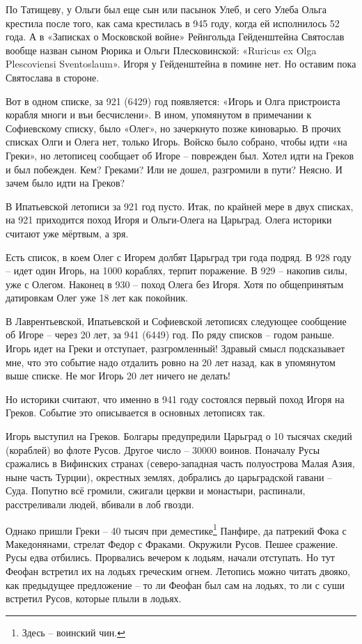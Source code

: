 По Татищеву, у Ольги был еще сын или пасынок Улеб, и сего Улеба Ольга крестила после того, как сама крестилась в 945 году, когда ей исполнилось 52 года. А в «Записках о Московской войне» Рейнгольда Гейденштейна Святослав вообще назван сыном Рюрика и Ольги Плесковинской: «Ruricus ex Olga Plescoviensi Sventoslaum». Игоря у Гейденштейна в помине нет. Но оставим пока Святослава в стороне.

Вот в одном списке, за 921 (6429) год появляется: «Игорь и Олга пристроиста корабля многи и въи бесчислени». В ином, упомянутом в примечании к Софиевскому списку, было «Олег», но зачеркнуто позже киноварью. В прочих списках Олги и Олега нет, только Игорь. Войско было собрано, чтобы идти «на Греки», но летописец сообщает об Игоре – поврежден был. Хотел идти на Греков и был побежден. Кем? Греками? Или не дошел, разгромили в пути? Неясно. И зачем было идти на Греков?

В Ипатьевской летописи за 921 год пусто. Итак, по крайней мере в двух списках, на 921 приходится поход Игоря и Ольги-Олега на Царьград. Олега историки считают уже мёртвым, а зря.

Есть список, в коем Олег с Игорем долбят Царьград три года подряд. В 928 году – идет один Игорь, на 1000 кораблях, терпит поражение. В 929 – накопив силы, уже с Олегом. Наконец в 930 – поход Олега без Игоря. Хотя по общепринятым датировкам Олег уже 18 лет как покойник.

В Лаврентьевской, Ипатьевской и Софиевской летописях следующее сообщение об Игоре – через 20 лет, за 941 (6449) год. По ряду списков – годом раньше. Игорь идет на Греки и отступает, разгромленный! Здравый смысл подсказывает мне, что это событие надо отдалить ровно на 20 лет назад, как в упомянутом выше списке. Не мог Игорь 20 лет ничего не делать!

Но историки считают, что именно в 941 году состоялся первый поход Игоря на Греков. Событие это описывается в основных летописях так.

Игорь выступил на Греков. Болгары предупредили Царьград о 10 тысячах скедий (кораблей) во флоте Русов. Другое число – 30000 воинов. Поначалу Русы сражались в Вифинских странах (северо-западная часть полуострова Малая Азия, ныне часть Турции), окрестных землях, добрались до царьградской гавани – Суда. Попутно всё громили, сжигали церкви и монастыри, распинали, расстреливали людей, вбивали в лоб гвозди.

Однако пришли Греки – 40 тысяч при деместике\footnote{Здесь – воинский чин.} Панфире, да патрекий Фока с Македонянами, стрелат Федор с Фраками. Окружили Русов. Пешее сражение. Русы едва отбились. Прорвались вечером к лодьям, начали отступать. Но тут Феофан встретил их на лодьях греческим огнем. Летопись можно читать двояко, как предыдущее предложение – то ли Феофан был сам на лодьях, то ли с суши встретил Русов, которые плыли в лодьях.

